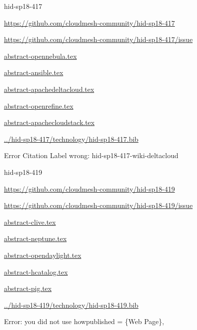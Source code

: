 \begin{IU}

hid-sp18-417

\url{https://github.com/cloudmesh-community/hid-sp18-417}

\url{https://github.com/cloudmesh-community/hid-sp18-417/issue}

\href{https://github.com/cloudmesh-community/hid-sp18-417/blob/master//technology/abstract-opennebula.tex}{abstract-opennebula.tex}

\href{https://github.com/cloudmesh-community/hid-sp18-417/blob/master//technology/abstract-ansible.tex}{abstract-ansible.tex}

\href{https://github.com/cloudmesh-community/hid-sp18-417/blob/master//technology/abstract-apachedeltacloud.tex}{abstract-apachedeltacloud.tex}

\href{https://github.com/cloudmesh-community/hid-sp18-417/blob/master//technology/abstract-openrefine.tex}{abstract-openrefine.tex}

\href{https://github.com/cloudmesh-community/hid-sp18-417/blob/master//technology/abstract-apachecloudstack.tex}{abstract-apachecloudstack.tex}

\href{https://github.com/cloudmesh-community/hid-sp18-417/blob/master//technology/hid-sp18-417.bib}{../hid-sp18-417/technology/hid-sp18-417.bib}

 Error Citation Label wrong:  hid-sp18-417-wiki-deltacloud

\end{IU}


\begin{IU}

hid-sp18-419

\url{https://github.com/cloudmesh-community/hid-sp18-419}

\url{https://github.com/cloudmesh-community/hid-sp18-419/issue}

\href{https://github.com/cloudmesh-community/hid-sp18-419/blob/master//technology/abstract-clive.tex}{abstract-clive.tex}

\href{https://github.com/cloudmesh-community/hid-sp18-419/blob/master//technology/abstract-neptune.tex}{abstract-neptune.tex}

\href{https://github.com/cloudmesh-community/hid-sp18-419/blob/master//technology/abstract-opendaylight.tex}{abstract-opendaylight.tex}

\href{https://github.com/cloudmesh-community/hid-sp18-419/blob/master//technology/abstract-hcatalog.tex}{abstract-hcatalog.tex}

\href{https://github.com/cloudmesh-community/hid-sp18-419/blob/master//technology/abstract-pig.tex}{abstract-pig.tex}

\href{https://github.com/cloudmesh-community/hid-sp18-419/blob/master//technology/hid-sp18-419.bib}{../hid-sp18-419/technology/hid-sp18-419.bib}

Error: you did not use howpublished = \{Web Page\},

\end{IU}


